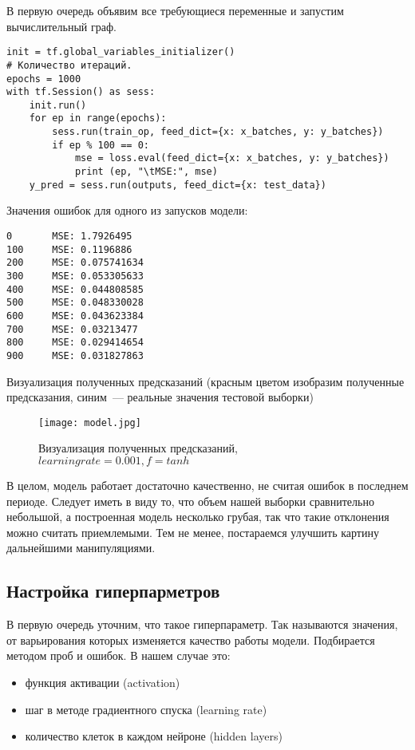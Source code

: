 \documentclass[12pt, a4paper]{article}
\begin{document}
В первую очередь объявим все требующиеся переменные и запустим вычислительный граф.
\begin{verbatim}
init = tf.global_variables_initializer()
# Количество итераций.
epochs = 1000
with tf.Session() as sess:
    init.run()
    for ep in range(epochs):
        sess.run(train_op, feed_dict={x: x_batches, y: y_batches})
        if ep % 100 == 0:
            mse = loss.eval(feed_dict={x: x_batches, y: y_batches})
            print (ep, "\tMSE:", mse)
    y_pred = sess.run(outputs, feed_dict={x: test_data})
\end{verbatim}

Значения ошибок для одного из запусков модели:

\begin{verbatim}
0   	MSE: 1.7926495
100 	MSE: 0.1196886
200 	MSE: 0.075741634
300 	MSE: 0.053305633
400 	MSE: 0.044808585
500 	MSE: 0.048330028
600 	MSE: 0.043623384
700 	MSE: 0.03213477
800 	MSE: 0.029414654
900 	MSE: 0.031827863
\end{verbatim}

Визуализация полученных предсказаний (красным цветом изобразим полученные предсказания, синим~--- реальные значения тестовой выборки)
\begin{figure}[ht]
	\noindent\centering
	\texttt{[image: model.jpg]}
	\caption{Визуализация полученных предсказаний, $learning rate = 0.001, f = tanh$}
\end{figure}

В целом, модель работает достаточно качественно, не считая ошибок в последнем периоде. Следует иметь в виду то, что объем нашей выборки сравнительно небольшой, а построенная модель несколько грубая, так что такие отклонения можно считать приемлемыми. Тем не менее, постараемся улучшить картину дальнейшими манипуляциями.

\subsection{Настройка гиперпарметров}

В первую очередь уточним, что такое гиперпараметр. Так называются значения, от варьирования которых изменяется качество работы модели. Подбирается методом проб и ошибок. В нашем случае это:
\begin{itemize}
	\item функция активации (activation)
	\item шаг в методе градиентного спуска (learning rate)
	\item количество клеток в каждом нейроне (hidden layers)
\end{itemize}
\end{document}
